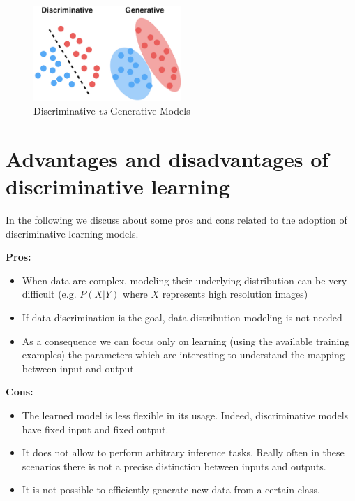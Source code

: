 \begin{figure}[H]
	\centering
	\includegraphics[width=0.5\textwidth]{
		images/12_LinearDiscriminantFunctions_discriminativeAndGenerative.png
	}
	\caption{Discriminative \textit{vs} Generative Models}
	\label{descriminative_generative_11}
\end{figure}

\section{Advantages and disadvantages of discriminative learning}
In the following we discuss about some pros and cons related to the adoption of discriminative
learning models.
\newline

\textbf{Pros:}
\begin{itemize}
	\item When data are complex, modeling their underlying distribution can be
		very difficult (e.g. $P(X|Y)$ where $X$ represents high resolution images)

	\item If data discrimination is the goal, data distribution modeling is not
		needed

	\item As a consequence we can focus only on learning (using the available
		training examples) the parameters which are interesting to understand the mapping
		between input and output
\end{itemize}

\textbf{Cons:}
\begin{itemize}
	\item The learned model is less flexible in its usage. Indeed, discriminative models
		have fixed input and fixed output.

	\item It does not allow to perform arbitrary inference tasks. Really often in
		these scenarios there is not a precise distinction between inputs and
		outputs.

	\item It is not possible to efficiently generate new data from a certain class.
\end{itemize}

